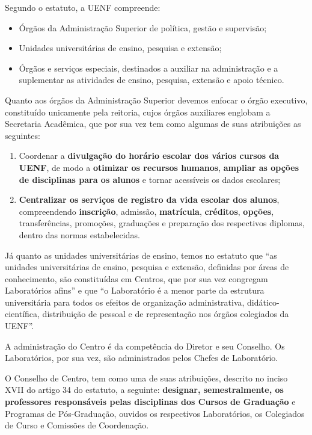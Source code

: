 
Segundo o estatuto, a UENF compreende:

\begin{itemize}
  \item Órgãos da Administração Superior de política, gestão e supervisão;
  \item Unidades universitárias de ensino, pesquisa e extensão;
  \item Órgãos e serviços especiais, destinados a auxiliar na administração e a suplementar as atividades de ensino, pesquisa, extensão e apoio técnico.
\end{itemize}

Quanto aos órgãos da Administração Superior devemos enfocar o órgão executivo, constituído unicamente pela reitoria, cujos órgãos auxiliares englobam a Secretaria Acadêmica, que por sua vez tem como algumas de suas atribuições as seguintes:

\begin{enumerate}
  \item Coordenar a \textbf{divulgação do horário escolar dos vários cursos da UENF}, de modo a \textbf{otimizar os recursos humanos}, \textbf{ampliar as opções de disciplinas para os alunos} e tornar acessíveis os dados escolares;
  \item \textbf{Centralizar os serviços de registro da vida escolar dos alunos}, compreendendo \textbf{inscrição}, admissão, \textbf{matrícula}, \textbf{créditos}, \textbf{opções}, transferências, promoções, graduações e preparação dos respectivos diplomas, dentro das normas estabelecidas.
\end{enumerate}

Já quanto as unidades universitárias de ensino, temos no estatuto que ``as unidades universitárias de ensino, pesquisa e extensão, definidas por áreas de conhecimento, são constituídas em Centros, que por sua vez congregam Laboratórios afins'' e que ``o Laboratório é a menor parte da estrutura universitária para todos os efeitos de organização administrativa, didático-científica, distribuição de pessoal e de representação nos órgãos colegiados da UENF''.

A administração do Centro é da competência do Diretor e seu Conselho. Os Laboratórios, por sua vez, são administrados pelos Chefes de Laboratório.

O Conselho de Centro, tem como uma de suas atribuições, descrito no inciso XVII do artigo 34 do estatuto, a seguinte: \textbf{designar, semestralmente, os professores responsáveis pelas disciplinas dos Cursos de Graduação} e Programas de Pós-Graduação, ouvidos os respectivos Laboratórios, os Colegiados de Curso e Comissões de Coordenação.

